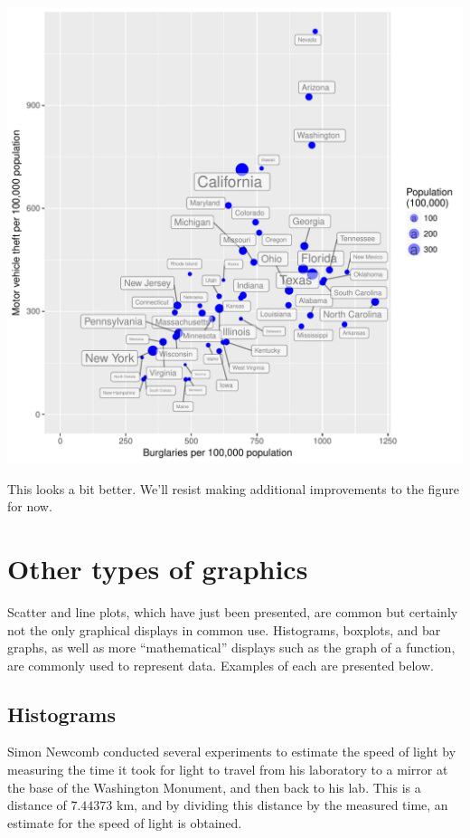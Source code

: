 \documentclass[12pt,oneside]{book}\usepackage[]{graphicx}\usepackage[]{color}
\makeatletter
\def\maxwidth{ %
  \ifdim\Gin@nat@width>\linewidth
    \linewidth
  \else
    \Gin@nat@width
  \fi
}
\newenvironment{knitrout}{}{} %
\makeatother
\begin{document}
\begin{knitrout}
\includegraphics[width=\maxwidth]{figure/unnamed-chunk-74-1} 

\end{knitrout}
This looks a bit better. We'll resist making additional improvements to the figure for now.

\section{Other types of graphics}
Scatter and line plots, which have just been presented, are common but certainly not the only graphical displays in common use. Histograms, boxplots, and bar graphs, as well as more ``mathematical'' displays such as the graph of a function, are commonly used to represent data. Examples of each are presented below. 

\subsection{Histograms} 
Simon Newcomb conducted several experiments to estimate the speed of light by measuring the time it took for light to travel from his laboratory to a mirror at the base of the Washington Monument, and then back to his lab. This is a distance of $7.44373$ km, and by dividing this distance by the measured time, an estimate for the speed of light is obtained. 
\end{document}
